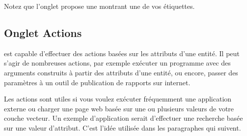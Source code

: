 Notez que l'onglet  propose une  montrant une de vos étiquettes.

\subsection{Onglet Actions}\label{label_actions}

\qg est capable d'effectuer des actions basées sur les attributs d'une entité. Il peut s'agir de nombreuses actions, par exemple exécuter un programme avec des arguments construits à partir des attributs d'une entité, ou encore, passer des paramètres à un outil de publication de rapports sur internet.

Les actions sont utiles si vous voulez exécuter fréquemment une application externe ou charger une page web basée sur une ou plusieurs valeurs de votre couche vecteur. Un exemple d'application serait d'effectuer une recherche basée sur une valeur d'attribut. C'est l'idée utilisée dans les paragraphes qui suivent.


